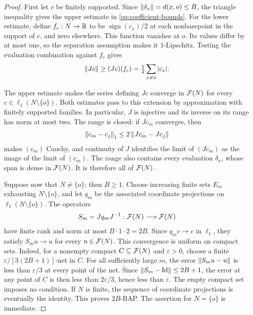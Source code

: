 \begin{proof}
First let $c$ be finitely supported. Since $\left\|\delta_x\right\|=d(x,o)\le B$,
the triangle inequality gives the upper estimate in
\eqref{eq:coefficient-bounds}. For the lower estimate, define
$f_c:N\to\mathbb R$ to be $\operatorname{sign}(c_x)/2$ at each nonbasepoint
in the support of $c$, and zero elsewhere. This function vanishes at
$o$. Its values differ by at most one, so the separation assumption
makes it $1$-Lipschitz. Testing the evaluation combination against $f_c$
gives
\[
 \left\|Jc\right\|\ge (Jc)(f_c)=\tfrac12\sum_{x\ne o}|c_x|.
\]

The upper estimate makes the series defining $Jc$ converge in $\mathcal F(N)$
for every $c\in\ell_1(N\setminus\{o\})$. Both estimates pass to this
extension by approximation with finitely supported families. In particular,
$J$ is injective and its inverse on its range has norm at most two.
The range is closed: if $Jc_m$ converges, then
\[
 \left\|c_m-c_j\right\|_1\le2\left\|Jc_m-Jc_j\right\|
\]
makes $(c_m)$ Cauchy, and continuity of $J$ identifies the limit of
$(Jc_m)$ as the image of the limit of $(c_m)$. The range also contains
every evaluation $\delta_x$, whose span is dense in $\mathcal F(N)$. It is
therefore all of $\mathcal F(N)$.

Suppose now that $N\ne\{o\}$; then $B\ge1$. Choose increasing finite
sets $E_m$ exhausting $N\setminus\{o\}$, and let $q_m$ be the associated
coordinate projections on $\ell_1(N\setminus\{o\})$. The operators
\[
 S_m=Jq_mJ^{-1}:\mathcal F(N)\longrightarrow\mathcal F(N)
\]
have finite rank and norm at most $B\cdot1\cdot2=2B$. Since
$q_mc\to c$ in $\ell_1$, they satisfy $S_mu\to u$ for every
$u\in\mathcal F(N)$. This convergence is uniform on compact sets. Indeed, for
a nonempty compact $C\subseteq\mathcal F(N)$ and $\varepsilon>0$, choose a
finite $\varepsilon/[3(2B+1)]$-net in $C$. For all sufficiently large
$m$, the error $\left\|S_mu-u\right\|$ is less than $\varepsilon/3$ at every
point of the net. Since $\left\|S_m-\operatorname{Id}\right\|\le2B+1$, the error at any
point of $C$ is then less than $2\varepsilon/3$, hence less than
$\varepsilon$. The empty compact set imposes no condition. If $N$ is
finite, the sequence of coordinate projections is eventually the identity.
This proves $2B$-BAP. The assertion for $N=\{o\}$ is immediate.
\end{proof}

